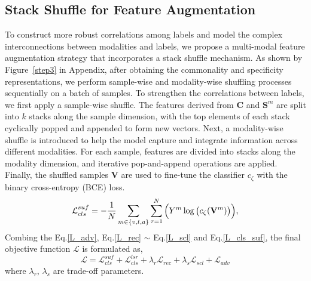 \subsection{Stack Shuffle for Feature Augmentation}
\label{stack_shuffle}

To construct more robust correlations among labels and model the complex interconnections between modalities and labels, we propose a multi-modal feature augmentation strategy that incorporates a stack shuffle mechanism. As shown by Figure~\ref{step3} in Appendix, after obtaining the commonality and specificity representations, we perform sample-wise and modality-wise shuffling processes sequentially on a batch of samples. To strengthen the correlations between labels, we first apply a sample-wise shuffle. The features derived from $\bm{C}$ and $\bm{S}^{m}$ are split into $k$ stacks along the sample dimension, with the top elements of each stack cyclically popped and appended to form new vectors.  
%  
Next, a modality-wise shuffle is introduced to help the model capture and integrate information across different modalities. For each sample, features are divided into stacks along the modality dimension, and iterative pop-and-append operations are applied.
Finally, the shuffled samples $\mathbf{V}$ are used to fine-tune the classifier $c_{\zeta}$ with the binary cross-entropy (BCE) loss.
\begin{equation}
\small
\label{L_cls_suf}
\mathcal{L}_{cls}^{suf} = -\frac{1}{N} \sum_{m \in \{v,t,a\}} \sum_{\tau=1}^{N} \Big(Y^{m} \log \big(c_{\zeta}(\mathbf{V}^m )\big)\Big),
\end{equation}
Combing the Eq.\eqref{L_adv}, Eq.\eqref{L_rec} $\sim$ Eq.\eqref{L_scl} and Eq.\eqref{L_cls_suf}, the final objective function $\mathcal{L}$ is formulated as,
\begin{equation}
\mathcal{L} = \mathcal{L}_{cls}^{suf} + \mathcal{L}_{cls}^{lsr} + \lambda_r \mathcal{L}_{rec} + \lambda_s \mathcal{L}_{scl} + \mathcal{L}_{adv}
\end{equation}
where $\lambda_r$, $\lambda_s$ are trade-off parameters.

